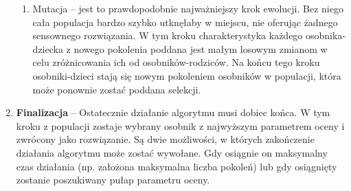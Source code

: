 \begin{enumerate}
\begin{enumerate}
		\item Mutacja -- jest to prawdopodobnie najważniejszy krok ewolucji. Bez niego cała populacja bardzo szybko utknęłaby w miejscu, nie oferując żadnego sensownego rozwiązania. W tym kroku charakterystyka każdego osobnika-dziecka z nowego pokolenia poddana jest małym losowym zmianom w celu zróżnicowania ich od osobników-rodziców. Na końcu tego kroku osobniki-dzieci stają się nowym pokoleniem osobników w populacji, która może ponownie zostać poddana selekcji.
	\end{enumerate}
	\item \textbf{Finalizacja} -- Ostatecznie działanie algorytmu musi dobiec końca. W tym kroku z populacji zostaje wybrany osobnik z najwyższym parametrem oceny i zwrócony jako rozwiązanie. Są dwie możliwości, w których zakończenie działania algorytmu może zostać wywołane. Gdy osiągnie on maksymalny czas działania (np. założona maksymalna liczba pokoleń) lub gdy osiągnięty zostanie poszukiwany pułap parametru oceny.
	\end{enumerate}	


